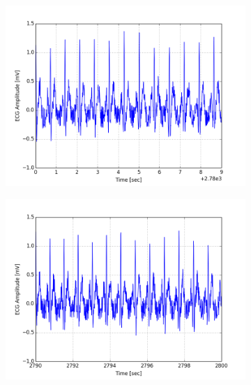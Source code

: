 \documentclass[paper=a4, fontsize=11pt]{scrartcl}
\numberwithin{equation}{section}		%
\numberwithin{figure}{section}			%
\numberwithin{table}{section}		    %
\begin{document}
\begin{appendices}
\begin{figure}[H]
	\centering
	\begin{subfigure}[b]{0.3\textwidth}
		\includegraphics[width=\textwidth]{sim/ecg_49}
	\end{subfigure}
	\begin{subfigure}[b]{0.3\textwidth}
		\includegraphics[width=\textwidth]{sim/ecg_50}
	\end{subfigure}
	\begin{subfigure}[b]{0.3\textwidth}

\end{subfigure}
\end{figure}
\end{appendices}
\end{document}

